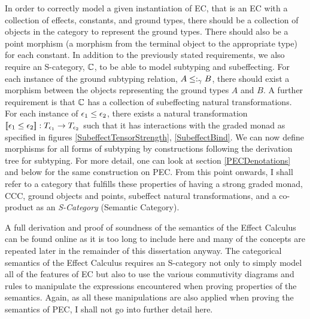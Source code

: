 \documentclass{Report}
\begin{document}
\begin{definition}[S-Category]
    In order to correctly model a given instantiation of EC, that is an EC with a collection of effects, constants, and ground types, there should be a collection of objects in the category to represent the ground types. There should also be a point morphism (a morphism from the terminal object to the appropriate type) for each constant. In addition to the previously stated requirements, we also require an S-category, $\mathbb{C}$, to be able to model subtyping and subeffecting. For each instance of the ground subtyping relation, $A \leq:_\gamma B$, there should exist a morphism between the objects representing the ground types $A$ and $B$. A further requirement is that $\mathbb{C}$ has a collection of subeffecting natural transformations. For each instance of $\epsilon_1 \leq \epsilon_2$, there exists a natural transformation ${\bf [\![}\epsilon_1\leq\epsilon_2{\bf ]\!]}: T_{\epsilon_1}{}\rightarrow T_{\epsilon_2}{}$ such that it has interactions with the graded monad as specified in figures \ref{SubeffectTensorStrength}, \ref{SubeffectBind}. We can now define morphisms for all forms of subtyping by constructions following the derivation tree for subtyping. For more detail, one can look at section \ref{PECDenotations} and below for the same construction on PEC. From this point onwards, I shall refer to a category that fulfills these properties of having a strong graded monad, CCC, ground objects and points, subeffect natural transformations, and a co-product as an \textit{S-Category} (Semantic Category).
\end{definition}

A full derivation and proof of soundness of the semantics of the Effect Calculus can be found online  as it is too long to include here and many of the concepts are repeated later in the remainder of this dissertation anyway. The categorical semantics of the Effect Calculus requires an S-category not only to simply model all of the features of EC but also to use the various commutivity diagrams and rules to manipulate the expressions encountered when proving properties of the semantics. Again, as all these manipulations are also applied when proving the semantics of PEC, I shall not go into further detail here.
\end{document}

